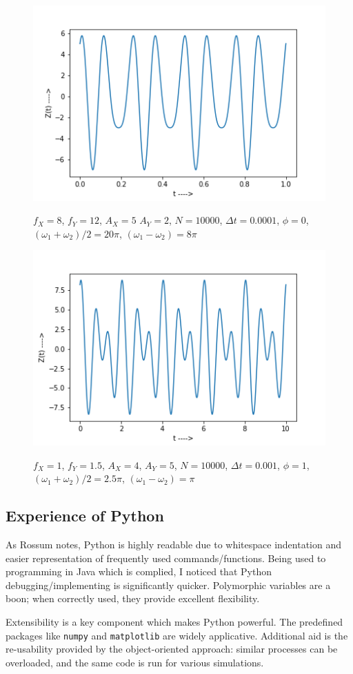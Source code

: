 \documentclass{report}
\begin{document}
\begin{figure}[H]
	\centering
	\includegraphics[width = \textwidth]{beats2.png}
	\label{beats2}
	\caption{$f_X=8$, $f_Y=12$, $A_X=5$ $A_Y=2$, $N=10000$, $\Delta t=0.0001$, $\phi=0$, $(\omega_1+\omega_2)/2=20\pi$, $(\omega_1-\omega_2)=8\pi$}
\end{figure}  
\begin{figure}[H]
	\centering
	\includegraphics[width = \textwidth]{beats3.png}
	\label{beats3}
	\caption{$f_X=1$, $f_Y=1.5$, $A_X=4$, $A_Y=5$, $N=10000$, $\Delta t=0.001$, $\phi=1$, $(\omega_1+\omega_2)/2=2.5\pi$, $(\omega_1-\omega_2)=\pi$}
\end{figure}  
\subsection*{Experience of Python}
As Rossum notes, Python is highly readable due to whitespace indentation and easier representation of frequently used commands/functions. Being used to programming in Java which is complied, I noticed that Python debugging/implementing is significantly quicker. Polymorphic variables are a boon; when correctly used, they provide excellent flexibility.

Extensibility is a key component which makes Python powerful. The predefined packages like \texttt{numpy} and \texttt{matplotlib} are widely applicative. Additional aid is the re-usability provided by the object-oriented approach: similar processes can be overloaded, and the same code is run for various simulations.
\end{document}
